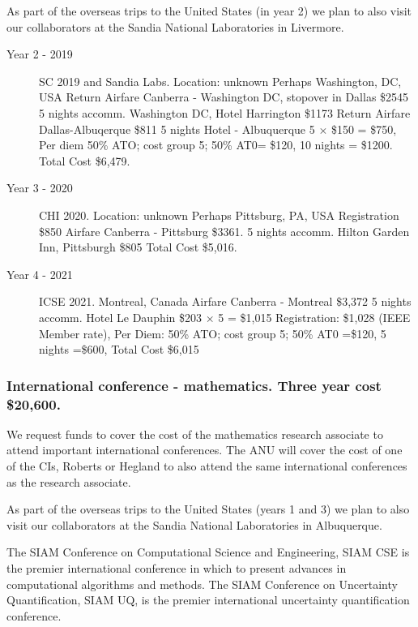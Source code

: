 \documentclass[a4paper,twoside,12pt,compact]{article}
\begin{document}
As part of the overseas trips to the United States (in year 2) we plan to also visit our collaborators at the Sandia National Laboratories in Livermore. 




\begin{description}




\item[Year 2 - 2019] SC 2019 and Sandia Labs.
Location: unknown
Perhaps Washington, DC, USA
Return Airfare Canberra - Washington DC, stopover in Dallas  \$2545
5 nights accomm. Washington DC, Hotel Harrington \$1173
Return Airfare Dallas-Albuqerque \$811
5 nights Hotel - Albuquerque 5 $\times$  \$150 = \$750,
Per diem 50\% ATO; cost group 5; 50\% AT0= \$120, 10 nights = \$1200. 
Total Cost \$6,479.

\item[Year 3 - 2020] CHI 2020.
Location: unknown 
Perhaps Pittsburg, PA, USA
Registration \$850 
Airfare Canberra - Pittsburg \$3361. 
5 nights accomm. Hilton Garden Inn, Pittsburgh \$805 
Total Cost \$5,016.

\item[Year 4 - 2021] ICSE 2021.
Montreal, Canada
Airfare Canberra - Montreal \$3,372
5 nights accomm. Hotel Le Dauphin \$203 $\times$ 5 = \$1,015
Registration: \$1,028 (IEEE Member rate),
Per Diem: 50\% ATO; cost group 5; 50\% AT0 =\$120, 5 nights =\$600,
Total Cost \$6,015


\end{description}


\subsubsection*{International conference - mathematics. Three year cost \$20,600.}


We request funds to cover the cost of the mathematics research associate to attend important international conferences.  The ANU will cover the cost of one of the CIs, Roberts or Hegland to also attend the same international conferences as the research associate. 

As part of the overseas trips to the United States (years 1 and 3) we plan to also visit our collaborators at the Sandia National Laboratories in Albuquerque. 

The SIAM Conference on Computational Science and Engineering, SIAM CSE is the premier international conference in which to present advances in computational algorithms and methods. The SIAM Conference on Uncertainty Quantification, SIAM UQ, is the premier international uncertainty quantification conference.
\end{document}
